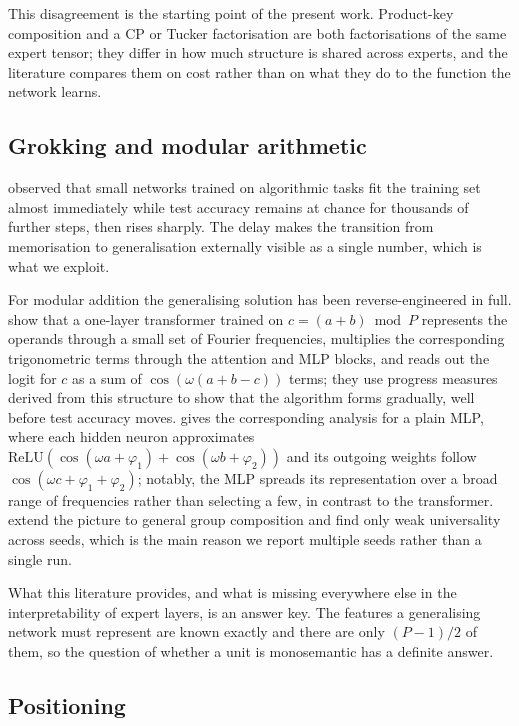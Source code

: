 This disagreement is the starting point of the present work. Product-key
composition and a CP or Tucker factorisation are both factorisations of the
same expert tensor; they differ in how much structure is shared across
experts, and the literature compares them on cost rather than on what they do
to the function the network learns.

\subsection{Grokking and modular arithmetic}

\citet{power2022grokking} observed that small networks trained on algorithmic
tasks fit the training set almost immediately while test accuracy remains at
chance for thousands of further steps, then rises sharply. The delay makes the
transition from memorisation to generalisation externally visible as a single
number, which is what we exploit.

For modular addition the generalising solution has been reverse-engineered in
full. \citet{nanda2023progress} show that a one-layer transformer trained on
$c = (a+b) \bmod P$ represents the operands through a small set of Fourier
frequencies, multiplies the corresponding trigonometric terms through the
attention and MLP blocks, and reads out the logit for $c$ as a sum of
$\cos(\omega(a+b-c))$ terms; they use progress measures derived from this
structure to show that the algorithm forms gradually, well before test
accuracy moves. \citet{bussmann2023modadd} gives the corresponding analysis
for a plain MLP, where each hidden neuron approximates
$\mathrm{ReLU}\!\left(\cos(\omega a + \varphi_1) + \cos(\omega b +
\varphi_2)\right)$ and its outgoing weights follow $\cos(\omega c + \varphi_1
+ \varphi_2)$; notably, the MLP spreads its representation over a broad range
of frequencies rather than selecting a few, in contrast to the transformer.
\citet{chughtai2023universality} extend the picture to general group
composition and find only weak universality across seeds, which is the main
reason we report multiple seeds rather than a single run.

What this literature provides, and what is missing everywhere else in the
interpretability of expert layers, is an answer key. The features a
generalising network must represent are known exactly and there are only
$(P-1)/2$ of them, so the question of whether a unit is monosemantic has a
definite answer.

\subsection{Positioning}

